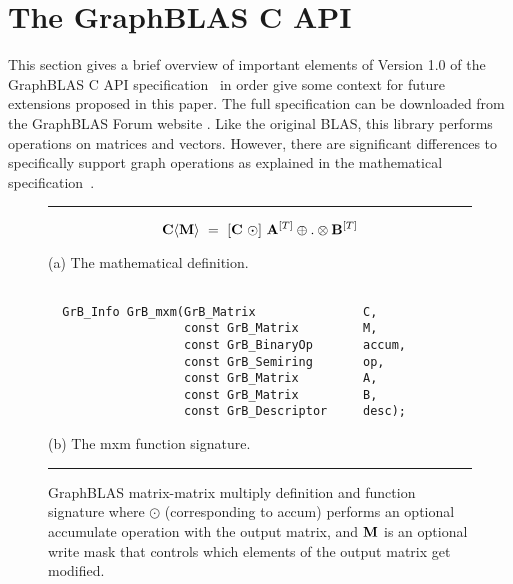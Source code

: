%
%

\renewcommand{\vector}[1]{{\bf #1}}
\renewcommand{\matrix}[1]{{\bf #1}}

\section{The GraphBLAS C API}
\label{sec:GrBCspec}

This section gives a brief overview of important elements 
of Version 1.0 of the GraphBLAS C API specification~\cite{graphblas_capi_17} in order give some context 
for future extensions proposed in this paper.  The full specification can be downloaded 
from the GraphBLAS Forum website \cite{graphblas_web}.  Like the original BLAS, 
this library performs operations on matrices and vectors.  However, there are 
significant differences to specifically support graph operations as explained
in the mathematical specification~\cite{mathgraphblas16}. 

\begin{figure}[b]
\hrule
\footnotesize
\[
\matrix{C}\langle \matrix{M} \rangle ~ = ~ [\matrix{C} ~\odot] ~ \matrix{A}^{[T]} \oplus.\otimes \matrix{B}^{[T]}
\]
\begin{center}(a) The mathematical definition.\end{center}

\begin{verbatim}

  GrB_Info GrB_mxm(GrB_Matrix               C,
                   const GrB_Matrix         M,  
                   const GrB_BinaryOp       accum,
                   const GrB_Semiring       op,
                   const GrB_Matrix         A, 
                   const GrB_Matrix         B,
                   const GrB_Descriptor     desc);
\end{verbatim}
\begin{center}(b) The {\sf mxm} function signature.\end{center}
\caption{GraphBLAS matrix-matrix multiply definition and function signature where 
$\odot$ (corresponding to {\sf accum}) performs an optional accumulate
operation with the output matrix, and $\matrix{M}$ is an optional write mask that
controls which elements of the output matrix get modified.\label{Fig:mxmfig}}
\hrule
\end{figure}

